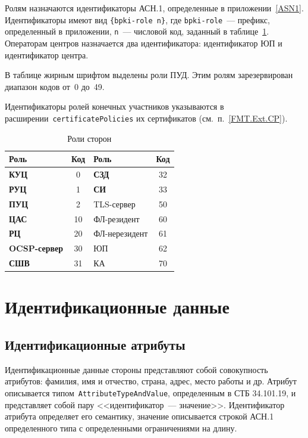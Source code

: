 Ролям назначаются идентификаторы АСН.1, определенные в приложении~\ref{ASN1}. 
Идентификаторы имеют вид \verb|{bpki-role n}|,
где \verb|bpki-role|~--- префикс, определенный в приложении,
\texttt{n}~--- числовой код, заданный в таблице~\ref{Table.ENTITIES.Roles}.
%
Операторам центров назначается два идентификатора: идентификатор ЮП и 
идентификатор центра. 

В таблице жирным шрифтом выделены роли ПУД.
Этим ролям зарезервирован диапазон кодов от~0 до~49.

Идентификаторы ролей конечных участников указываются в 
расширении~\texttt{certificatePolicies} их сертификатов
(см.~п.~\ref{FMT.Ext.CP}).

\begin{table}[bht]
\caption{Роли сторон}
\label{Table.ENTITIES.Roles}
\begin{tabular}{|l|c||l|c|}
\hline
Роль & Код & Роль & Код\\
\hline
\hline
{\bf КУЦ}        & 0    & {\bf СЗД}      & 32 \\
{\bf РУЦ}        & 1    & {\bf СИ}       & 33 \\
{\bf ПУЦ}        & 2    & TLS-сервер     & 50 \\
{\bf ЦАС}        & 10   & ФЛ-резидент    & 60 \\
{\bf РЦ}         & 20   & ФЛ-нерезидент  & 61 \\
{\bf OCSP-сервер}& 30   & ЮП             & 62 \\
{\bf СШВ}        & 31   & КА             & 70 \\
\hline
\end{tabular}
\end{table}

\section{Идентификационные данные}\label{ENTITIES.Name}

\subsection{Идентификационные атрибуты}\label{ENTITIES.Attrs}

Идентификационные данные стороны представляют собой совокупность атрибутов: 
фамилия, имя и отчество, страна, адрес, место работы и др.  
%
Атрибут описывается типом~\texttt{AttributeTypeAndValue}, определенным в 
СТБ 34.101.19, и представляет собой пару <<идентификатор~--- значение>>. 
Идентификатор атрибута определяет его семантику, 
значение описывается строкой АСН.1 определенного типа с определенными 
ограничениями на длину.  

